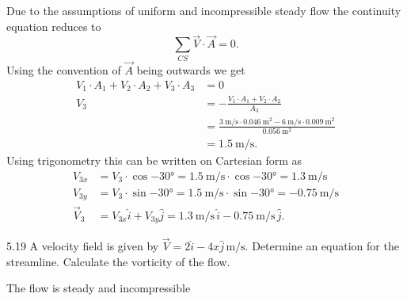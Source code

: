 \begin{derivation}
  Due to the assumptions of uniform and incompressible steady flow the continuity equation reduces to
  \[ 
    \sum_{CS} \Vec{V} \cdot \Vec{A} = 0 
  .\]
  Using the convention of $\Vec{A}$ being outwards we get
  \begin{align*}
    V_1 \cdot A_1 + V_2 \cdot A_2 + V_3 \cdot A_3 &= 0 \\
    V_3 &= -\frac{V_1 \cdot A_1 + V_2 \cdot A_2}{A_3} \\
              &= \frac{\qty{3}{\m\per\s} \cdot \qty{0,046}{\square\m} - \qty{6}{\m\per\s} \cdot \qty{0,009}{\square\m}}{\qty{0,056}{\square\m} } \\
              &= \qty{1,5}{\m\per\s} 
  .\end{align*}
  Using trigonometry this can be written on Cartesian form as
  \begin{align*}
    V_{3x} &= V_3 \cdot \cos \ang{-30} = \qty{1,5}{\m\per\s} \cdot \cos \ang{-30} = \qty{1,3}{\m\per\s} \\
    V_{3y} &= V_3 \cdot \sin \ang{-30} = \qty{1,5}{\m\per\s} \cdot \sin \ang{-30} = \qty{-0,75}{\m\per\s}  \\
    \Vec{V}_3 &= V_{3x} \hat{i} + V_{3y} \hat{j} = \qty{1,3}{\m\per\s} \, \hat{i} - \qty{0,75}{\m\per\s} \, \hat{j}
  .\end{align*}
\end{derivation}



\begin{problem}{5.19}
  A velocity field is given by $\Vec{V} = 2 \hat{i} - 4 x \hat{j} \, \unit{\m\per\s}$.
  Determine an equation for the streamline.
  Calculate the vorticity of the flow.
\end{problem}

\begin{assumptions}
  \item The flow is steady and incompressible
\end{assumptions}


